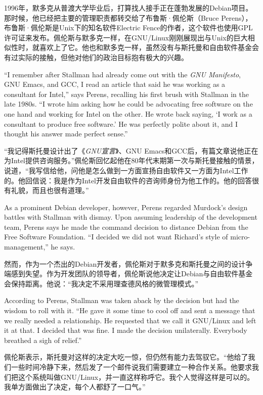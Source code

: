 \ifdefined\chs
1996年，默多克从普渡大学毕业后，打算找人接手正在蓬勃发展的Debian项目。那时候，他已经把主要的管理职责都转交给了布鲁斯·佩伦斯（Bruce Perens），布鲁斯·佩伦斯是Unix下的知名软件Electric Fence的作者，这个软件也使用GPL许可证来发布。佩伦斯与默多克一样，在GNU/Linux刚刚展现出与Unix的巨大相似性时，就喜欢上了它。他也和默多克一样，虽然没有与斯托曼和自由软件基金会有过实际的接触，但他对他们的政治目标抱有极大的兴趣。
\fi

\ifdefined\eng
``I remember after Stallman had already come out with the \textit{GNU Manifesto}, GNU Emacs, and GCC, I read an article that said he was working as a consultant for Intel,'' says Perens, recalling his first brush with Stallman in the late 1980s. ``I wrote him asking how he could be advocating free software on the one hand and working for Intel on the other. He wrote back saying, `I work as a consultant to produce free software.' He was perfectly polite about it, and I thought his answer made perfect sense.''
\fi

\ifdefined\chs
``我记得斯托曼设计出了《\textit{GNU宣言}》、GNU Emacs和GCC后，有篇文章说他正在为Intel提供咨询服务。''佩伦斯回忆起他在80年代末期第一次与斯托曼接触的情景，说道，``我写信给他，问他是怎么做到一方面宣扬自由软件又一方面为Intel工作的。他回信说：我是作为Intel开发自由软件的咨询师身份为他工作的。他的回答很有礼貌，而且也很有道理。''
\fi

\ifdefined\eng
As a prominent Debian developer, however, Perens regarded Murdock's design battles with Stallman with dismay. Upon assuming leadership of the development team, Perens says he made the command decision to distance Debian from the Free Software Foundation. ``I decided we did not want Richard's style of micro-management,'' he says.
\fi

\ifdefined\chs
然而，作为一个杰出的Debian开发者，佩伦斯对于默多克和斯托曼之间的设计争端感到失望。作为开发团队的领导者，佩伦斯说他决定让Debian与自由软件基金会保持距离。他说：``我决定不采用理查德风格的微管理模式。''
\fi

\ifdefined\eng
According to Perens, Stallman was taken aback by the decision but had the wisdom to roll with it. ``He gave it some time to cool off and sent a message that we really needed a relationship. He requested that we call it GNU/Linux and left it at that. I decided that was fine. I made the decision unilaterally. Everybody breathed a sigh of relief.''
\fi

\ifdefined\chs
佩伦斯表示，斯托曼对这样的决定大吃一惊，但仍然有能力去驾驭它。``他给了我们一些时间冷静下来，然后发了一个邮件说我们需要建立一种合作关系。他要求我们把这个系统叫做GNU/Linux，并一直这样称呼它。我个人觉得这样是可以的。我单方面做出了决定，每个人都舒了一口气。''
\fi

